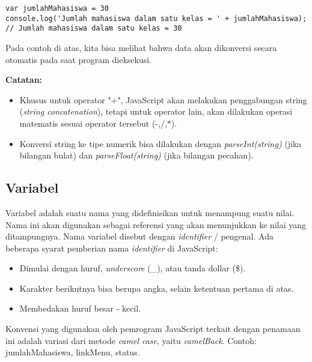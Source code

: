 \begin{lstlisting}
var jumlahMahasiswa = 30
console.log('Jumlah mahasiswa dalam satu kelas = ' + jumlahMahasiswa);
// Jumlah mahasiswa dalam satu kelas = 30
\end{lstlisting} 

Pada contoh di atas, kita bisa melihat bahwa data akan dikonversi secara otomatis pada saat program dieksekusi.

\begin{Sbox}
\begin{minipage}{\textwidth}
\textbf{Catatan:}
\begin{itemize}
  \item Khusus untuk operator "+", JavaScript akan melakukan penggabungan string (\textit{string concatenation}), tetapi untuk operator lain, akan dilakukan operasi matematis sesuai operator tersebut (-,/,*).
  \item Konversi string ke tipe numerik bisa dilakukan dengan \textit{parseInt(string)} (jika bilangan bulat) dan \textit{parseFloat(string)} (jika bilangan pecahan).
\end{itemize}
\end{minipage}
\end{Sbox}
\begin{center}
\shadowbox{\TheSbox}
\end{center}

\subsection{Variabel}

Variabel adalah suatu nama yang didefinisikan untuk menampung suatu nilai. Nama ini akan digunakan sebagai referensi yang akan menunjukkan ke nilai yang ditampungnya. Nama variabel disebut dengan \textit{identifier} / pengenal. Ada beberapa syarat pemberian nama \textit{identifier} di JavaScript: 
\begin{itemize}
  \item Dimulai dengan huruf, \textit{underscore} (\_), atau tanda dollar (\$).
  \item Karakter berikutnya bisa berupa angka, selain ketentuan pertama di atas.
  \item Membedakan huruf besar - kecil.
\end{itemize}
Konvensi yang digunakan oleh pemrogram JavaScript terkait dengan penamaan ini adalah variasi dari metode \textit{camel case}, yaitu \textit{camelBack}. Contoh: jumlahMahasiswa, linkMenu, status.

